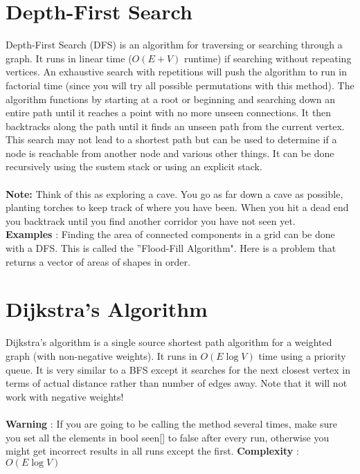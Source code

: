 	\section{Depth-First Search}
	
	Depth-First Search (DFS) is an algorithm for traversing or searching through 
	a graph. It runs in linear time ($O\left(E+V\right)$ runtime) if searching 
	without repeating vertices. An  exhaustive search with repetitions will 
	push the algorithm to run in factorial time (since you will try all possible 
	permutations with this method). The algorithm functions by starting at a root 
	or beginning and searching down an entire path until it reaches a point with 
	no more unseen connections. It then backtracks along the path until it finds 
	an unseen path from the current vertex. This search may not lead to a 
	shortest path but can be used to determine if a node is reachable from 
	another node and various other things. It can be done recursively using the 
	sustem stack or using an explicit stack.\\
	\ \\
	{\bf Note: } Think of this as exploring a cave. You go as far down a cave as 
	possible, planting torches to keep track of where you have been. When you 
	hit a dead end you backtrack until you find another corridor you have not 
	seen yet. \\
	{\bf Examples} :
	Finding the area of connected components in a grid can be done with a DFS. 
	This is called the ''Flood-Fill Algorithm". Here is a problem that returns 
	a  vector of areas of shapes in order.\\
	
	
	
	\section{Dijkstra's Algorithm}
	
	Dijkstra's algorithm is a single source shortest path algorithm for a 
	weighted graph (with non-negative weights). It runs in $O(E\log{V})$ time using 
	a priority queue. It is very similar to a BFS except it searches for the 
	next closest vertex in terms of actual distance rather than number of edges 
	away. Note that it will not work with negative weights! \\
	\ \\
    {\bf Warning} : If you are going to be calling the method several times, make sure 
    you set all the elements in bool seen[]  to false after every run, otherwise 
    you might get incorrect results in all runs except the first.
    {\bf Complexity} : $O(E\log{V})$\\
    

